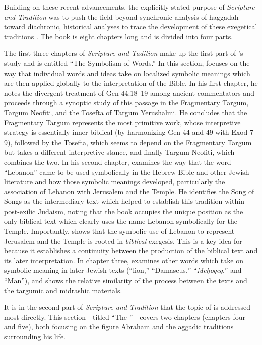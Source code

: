  Building on these recent advancements, the explicitly stated purpose of \emph{Scripture and Tradition} was to push the field beyond synchronic analysis of haggadah toward diachronic, historical analyses to trace the development of these exegetical traditions \autocites[1]{vermes1961}[See also][]{bloch1955_repr}. The book is eight chapters long and is divided into four parts. 

 The first three chapters of \emph{Scripture and Tadition} make up the first part of \vermes's study and is entitled ``The Symbolism of Words.'' In this section, \vermes focuses on the way that individual words and ideas take on localized symbolic meanings which are then applied globally to the interpretation of the Bible. In his first chapter, he notes the divergent treatment of Gen 44:18--19 among ancient commentators and proceeds through a synoptic study of this passage in the Fragmentary Targum, Targum Neofiti, and the Tosefta of Targum Yerushalmi. He concludes that the Fragmentary Targum represents the most primitive work, whose interpretive strategy is essentially inner-biblical (by harmonizing Gen 44 and 49 with Exod 7--9), followed by the Tosefta, which seems to depend on the Fragmentary Targum but takes a different interpretive stance, and finally Targum Neofiti, which combines the two. In his second chapter, \vermes examines the way that the word ``Lebanon'' came to be used symbolically in the Hebrew Bible and other Jewish literature and how those symbolic meanings developed, particularly the association of Lebanon with Jerusalem and the Temple. He identifies the Song of Songs as the intermediary text which helped to establish this tradition within post-exilic Judaism, noting that the book occupies the unique position as the only biblical text which clearly uses the name Lebanon symbolically for the Temple. Importantly, \vermes shows that the symbolic use of Lebanon to represent Jerusalem and the Temple is rooted in \emph{biblical} exegesis. This is a key idea for \vermes because it establishes a continuity between the production of the biblical text and its later interpretation. In chapter three, \vermes examines other words which take on symbolic meaning in later Jewish texts (``lion,'' ``Damascus,'' ``\emph{Meḥoqeq},'' and ``Man''), and shows the relative similarity of the process between the \dss texts and the targumic and midrashic materials. 

 It is in the second part of \emph{Scripture and Tradition} that the topic of \RwB is addressed most directly. This section---titled ``The \RwB''---covers two chapters (chapters four and five), both focusing on the figure Abraham and the aggadic traditions surrounding his life. 

